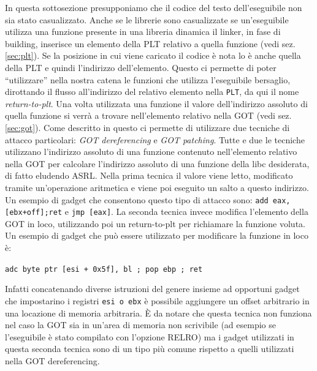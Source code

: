 In questa sottosezione presupponiamo che il codice del testo
dell'eseguibile non sia stato casualizzato. Anche se le librerie sono
casualizzate se un'eseguibile utilizza una funzione presente in una
libreria dinamica il linker, in fase di building, inserisce un
elemento della PLT relativo a quella funzione (vedi
sez. \ref{sec:plt}). Se la posizione in cui viene caricato il codice è
nota lo è anche quella della PLT e quindi l'indirizzo
dell'elemento. Questo ci permette di poter ``utilizzare'' nella nostra
catena le funzioni che utilizza l'eseguibile bersaglio, dirottando il
flusso all'indirizzo del relativo elemento nella \lstinline{PLT}, da
qui il nome \emph{return-to-plt}. Una volta utilizzata una funzione il
valore dell'indirizzo assoluto di quella funzione si verrà a trovare
nell'elemento relativo nella GOT (vedi sez. \ref{sec:got}). Come
descritto in \cite{roglia:2009} questo ci permette di utilizzare due
tecniche di attacco particolari: \emph{GOT dereferencing} e \emph{GOT
  patching}. Tutte e due le tecniche utilizzano l'indirizzo assoluto
di una funzione contenuto nell'elemento relativo nella GOT per
calcolare l'indirizzo assoluto di una funzione della libc desiderata,
di fatto eludendo ASRL. Nella prima tecnica il valore viene letto,
modificato tramite un'operazione aritmetica e viene poi eseguito un
salto a questo indirizzo. Un esempio di gadget che consentono questo
tipo di attacco sono: \lstinline{add eax,[ebx+off];ret} e
\lstinline{jmp [eax]}. La seconda tecnica invece modifica l'elemento
della GOT in loco, utilizzando poi un return-to-plt per richiamare la
funzione voluta. Un esempio di gadget che può essere utilizzato per
modificare la funzione in loco è:

\lstinline{adc byte ptr [esi + 0x5f], bl ; pop ebp ; ret}

Infatti concatenando diverse istruzioni del genere insieme ad
opportuni gadget che impostarino i registri \lstinline{esi o ebx} è
possibile aggiungere un offset arbitrario in una locazione di memoria
arbitraria. È da notare che questa tecnica non funziona nel caso la
GOT sia in un'area di memoria non scrivibile (ad esempio se
l'eseguibile è stato compilato con l'opzione RELRO) ma i gadget
utilizzati in questa seconda tecnica sono di un tipo più comune
rispetto a quelli utilizzati nella GOT dereferencing.


